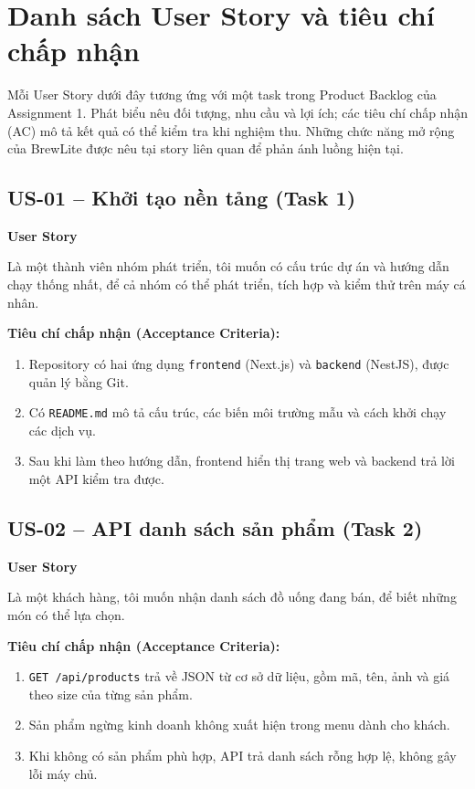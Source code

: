 \section{Danh sách User Story và tiêu chí chấp nhận}

Mỗi User Story dưới đây tương ứng với một task trong Product Backlog của Assignment 1. Phát biểu nêu đối tượng, nhu cầu và lợi ích; các tiêu chí chấp nhận (AC) mô tả kết quả có thể kiểm tra khi nghiệm thu. Những chức năng mở rộng của BrewLite được nêu tại story liên quan để phản ánh luồng hiện tại.

\subsection{US-01 -- Khởi tạo nền tảng (Task 1)}
\textbf{User Story}\par
Là một thành viên nhóm phát triển, tôi muốn có cấu trúc dự án và hướng dẫn chạy thống nhất, để cả nhóm có thể phát triển, tích hợp và kiểm thử trên máy cá nhân.

\textbf{Tiêu chí chấp nhận (Acceptance Criteria):}
\begin{enumerate}
  \item Repository có hai ứng dụng \texttt{frontend} (Next.js) và \texttt{backend} (NestJS), được quản lý bằng Git.
  \item Có \texttt{README.md} mô tả cấu trúc, các biến môi trường mẫu và cách khởi chạy các dịch vụ.
  \item Sau khi làm theo hướng dẫn, frontend hiển thị trang web và backend trả lời một API kiểm tra được.
\end{enumerate}

\subsection{US-02 -- API danh sách sản phẩm (Task 2)}
\textbf{User Story}\par
Là một khách hàng, tôi muốn nhận danh sách đồ uống đang bán, để biết những món có thể lựa chọn.

\textbf{Tiêu chí chấp nhận (Acceptance Criteria):}
\begin{enumerate}
  \item \texttt{GET /api/products} trả về JSON từ cơ sở dữ liệu, gồm mã, tên, ảnh và giá theo size của từng sản phẩm.
  \item Sản phẩm ngừng kinh doanh không xuất hiện trong menu dành cho khách.
  \item Khi không có sản phẩm phù hợp, API trả danh sách rỗng hợp lệ, không gây lỗi máy chủ.
\end{enumerate}

